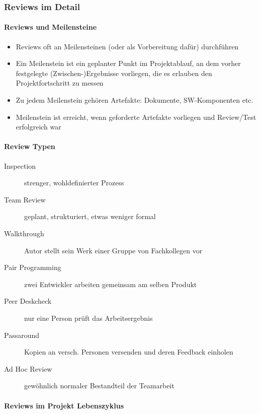 \documentclass[a4paper]{article}
\begin{document}
			\subsubsection{Reviews im Detail}
			
				\paragraph{Reviews und Meilensteine}
				
					\begin{itemize}
						\item Reviews oft an Meilensteinen (oder als Vorbereitung dafür) durchführen
						\item Ein Meilenstein ist ein geplanter Punkt im Projektablauf, an dem vorher festgelegte (Zwischen-)Ergebnisse vorliegen, die es erlauben den Projektfortschritt zu messen
						\item Zu jedem Meilenstein gehören Artefakte: Dokumente, SW-Komponenten etc.
						\item Meilenstein ist erreicht, wenn geforderte Artefakte vorliegen und Review/Test erfolgreich war
					\end{itemize}
			
				\paragraph{Review Typen}
				
					\begin{description}
						\item[Inspection] strenger, wohldefinierter Prozess
						\item[Team Review] geplant, strukturiert, etwas weniger formal
						\item[Walkthrough] Autor stellt sein Werk einer Gruppe von Fachkollegen vor
						\item[Pair Programming] zwei Entwickler arbeiten gemeinsam am selben Produkt
						\item[Peer Deskcheck] nur eine Person prüft das Arbeitsergebnis
						\item[Passaround] Kopien an versch. Personen versenden und deren Feedback einholen
						\item[Ad Hoc Review] gewöhnlich normaler Bestandteil der Teamarbeit
					\end{description}
					
				\paragraph{Reviews im Projekt Lebenszyklus}
				
\end{document}
